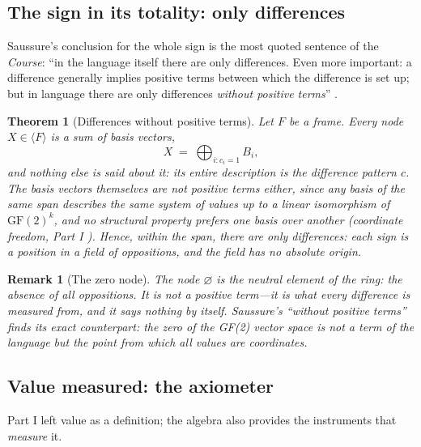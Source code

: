 \documentclass[11pt,a4paper]{article}
\newtheorem{theorem}[principle]{Theorem}
\newtheorem{remark}[principle]{Remark}
\theoremstyle{remark}
\newcommand{\spanof}[1]{\ensuremath{\langle #1\rangle}}  %
\begin{document}
\subsection{The sign in its totality: only differences}
\label{sec:totality}

Saussure's conclusion for the whole sign is the most quoted sentence of the
\textit{Course}: ``in the language itself there are only differences. Even
more important: a difference generally implies positive terms between which
the difference is set up; but in language there are only differences
\emph{without positive terms}'' \cite[Part II, ch.~IV, \S4]{harris1983}.

\begin{theorem}[Differences without positive terms]
\label{thm:differences}
Let $F$ be a frame. Every node $X \in \spanof{F}$ is a sum of basis vectors,
\[
  X \;=\; \bigoplus_{i : c_i = 1} B_i,
\]
and nothing else is said about it: its entire description is the difference
pattern $c$. The basis vectors themselves are not positive terms either, since
any basis of the same span describes the same system of values up to a
linear isomorphism of $\mathrm{GF}(2)^k$, and no structural property
prefers one basis over another (coordinate freedom, Part I
\cite{part1}). Hence, within the span, there are only differences: each sign
is a position in a field of oppositions, and the field has no absolute origin.
\end{theorem}

\begin{remark}[The zero node]
The node $\varnothing$ is the neutral element of the ring: the absence of all
oppositions. It is not a positive term---it is what every difference is
measured from, and it says nothing by itself. Saussure's ``without positive
terms'' finds its exact counterpart: the zero of the GF(2) vector space is
not a term of the language but the point from which all values are
coordinates.
\end{remark}

\subsection{Value measured: the axiometer}
\label{sec:axiometer}

Part I left value as a definition; the algebra also provides the instruments
that \emph{measure} it.
\end{document}
